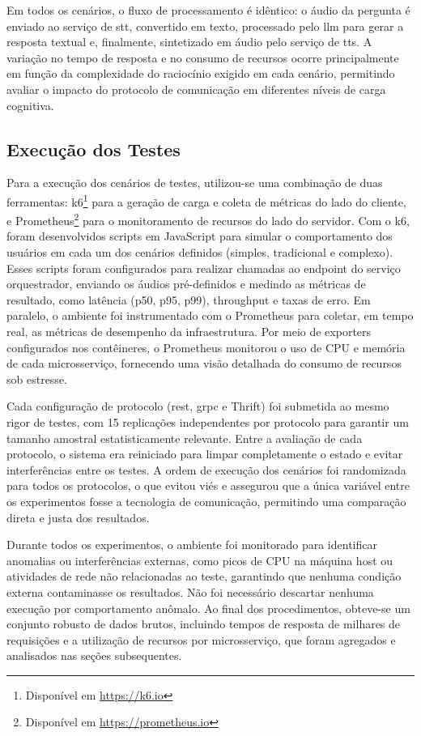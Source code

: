 Em todos os cenários, o fluxo de processamento é idêntico: o áudio da pergunta é enviado ao serviço de \gls{stt}, convertido em texto, processado pelo \gls{llm} para gerar a resposta textual e, finalmente, sintetizado em áudio pelo serviço de \gls{tts}. A variação no tempo de resposta e no consumo de recursos ocorre principalmente em função da complexidade do raciocínio exigido em cada cenário, permitindo avaliar o impacto do protocolo de comunicação em diferentes níveis de carga cognitiva.

\subsection{Execução dos Testes}

Para a execução dos cenários de testes, utilizou-se uma combinação de duas ferramentas: k6\footnote{Disponível em \url{https://k6.io}} para a geração de carga e coleta de métricas do lado do cliente, e Prometheus\footnote{Disponível em \url{https://prometheus.io}} para o monitoramento de recursos do lado do servidor. Com o k6, foram desenvolvidos scripts em JavaScript para simular o comportamento dos usuários em cada um dos cenários definidos (simples, tradicional e complexo). Esses scripts foram configurados para realizar chamadas ao endpoint do serviço orquestrador, enviando os áudios pré-definidos e medindo as métricas de resultado, como latência (p50, p95, p99), throughput e taxas de erro. Em paralelo, o ambiente foi instrumentado com o Prometheus para coletar, em tempo real, as métricas de desempenho da infraestrutura. Por meio de exporters configurados nos contêineres, o Prometheus monitorou o uso de CPU e memória de cada microsserviço, fornecendo uma visão detalhada do consumo de recursos sob estresse.

Cada configuração de protocolo (\gls{rest}, \gls{grpc} e Thrift) foi submetida ao mesmo rigor de testes, com 15 replicações independentes por protocolo para garantir um tamanho amostral estatisticamente relevante. Entre a avaliação de cada protocolo, o sistema era reiniciado para limpar completamente o estado e evitar interferências entre os testes. A ordem de execução dos cenários foi randomizada para todos os protocolos, o que evitou viés e assegurou que a única variável entre os experimentos fosse a tecnologia de comunicação, permitindo uma comparação direta e justa dos resultados.

Durante todos os experimentos, o ambiente foi monitorado para identificar anomalias ou interferências externas, como picos de CPU na máquina host ou atividades de rede não relacionadas ao teste, garantindo que nenhuma condição externa contaminasse os resultados. Não foi necessário descartar nenhuma execução por comportamento anômalo. Ao final dos procedimentos, obteve-se um conjunto robusto de dados brutos, incluindo tempos de resposta de milhares de requisições e a utilização de recursos por microsserviço, que foram agregados e analisados nas seções subsequentes.

